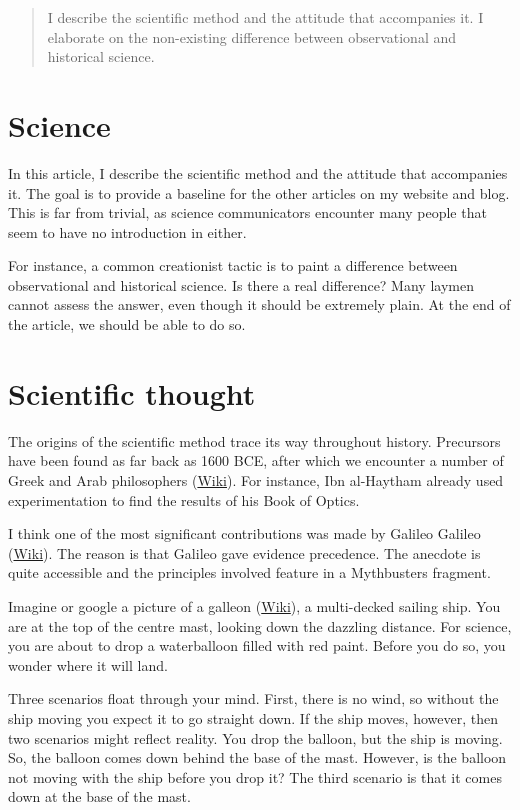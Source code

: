 \begin{abstract}
 
I describe the scientific method and the attitude that accompanies it. I elaborate on the non-existing difference between observational and historical science.
\end{abstract}
\begin{multicols}{2}
\section{Science}

In this article, I describe the scientific method and the attitude that accompanies it. The goal is to provide a baseline
for the other articles on my website and blog. This is far from trivial, as science communicators encounter many people
that seem to have no introduction in either.


For instance, a common creationist tactic is to paint a difference between observational and historical science. Is there
a real difference? Many laymen cannot assess the answer, even though it should be extremely plain. At the end of the article, we
should be able to do so.

\section{Scientific thought}

The origins of the scientific method trace its way throughout history. Precursors have been found as far back as 1600 BCE,
after which we encounter a number of Greek and Arab philosophers (\href{http://en.wikipedia.org/wiki/List_of_ancient_Greek_philosophers}{Wiki}). For instance, Ibn al-Haytham already used experimentation
to find the results of his Book of Optics. 


I think one of the most significant contributions was made by Galileo Galileo (\href{https://en.wikipedia.org/wiki/Galileo_Galilei}{Wiki}). The reason is that Galileo gave evidence precedence. The anecdote is quite accessible and the principles involved
feature in a Mythbusters fragment.  


Imagine or google a picture of a galleon (\href{https://en.wikipedia.org/wiki/Galleon}{Wiki}), a multi-decked sailing ship.
You are at the top of the centre mast, looking down the dazzling distance. For science, you are about to drop a waterballoon filled with red paint.
Before you do so, you wonder where it will land.


Three scenarios float through your mind. First, there is no wind, so without the ship moving you expect it to go straight down. If the ship moves,
however, then two scenarios might reflect reality. You drop the balloon, but the ship is moving. So, the balloon comes down behind the base of
the mast. However, is the balloon not moving with the ship before you drop it? The third scenario is that it comes down at the base of the mast.



\end{multicols}
